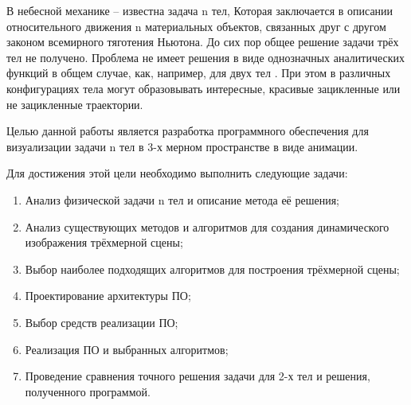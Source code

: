
В небесной механике – известна задача n тел, Которая заключается в описании относительного движения n материальных объектов, связанных друг с другом законом всемирного тяготения Ньютона. До сих пор общее решение задачи трёх тел не получено.
Проблема не имеет решения в виде однозначных аналитических функций в общем случае, как, например, для двух тел \cite{solution3}. При этом в различных конфигурациях тела могут образовывать интересные, красивые зацикленные или не зацикленные траектории.

Целью данной работы является разработка программного обеспечения для визуализации задачи n тел в 3-х мерном пространстве в виде анимации.

Для достижения этой цели необходимо выполнить следующие задачи:

\begin{enumerate}
	\item Анализ физической задачи n тел и описание метода её решения;
	\item Анализ существующих методов и алгоритмов для создания динамического изображения трёхмерной сцены;
	\item Выбор наиболее подходящих алгоритмов для построения трёхмерной сцены;
	\item Проектирование архитектуры ПО;
	\item Выбор средств реализации ПО;
	\item Реализация ПО и выбранных алгоритмов;
	\item Проведение сравнения точного решения задачи для 2-х тел и решения, полученного программой.
\end{enumerate}

\clearpage
